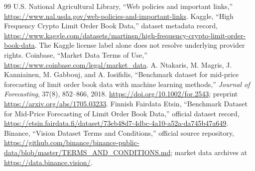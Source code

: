 \documentclass[10pt]{article}
\begin{document}
\begin{thebibliography}{99}
 U.S. National Agricultural Library, ``Web policies and important links,'' \url{https://www.nal.usda.gov/web-policies-and-important-links}.
 Kaggle, ``High Frequency Crypto Limit Order Book Data,'' dataset metadata record, \url{https://www.kaggle.com/datasets/martinsn/high-frequency-crypto-limit-order-book-data}. The Kaggle license label alone does not resolve underlying provider rights.
 Coinbase, ``Market Data Terms of Use,'' \url{https://www.coinbase.com/legal/market_data}.
 A. Ntakaris, M. Magris, J. Kanniainen, M. Gabbouj, and A. Iosifidis, ``Benchmark dataset for mid-price forecasting of limit order book data with machine learning methods,'' \emph{Journal of Forecasting}, 37(8), 852--866, 2018. \url{https://doi.org/10.1002/for.2543}; preprint \url{https://arxiv.org/abs/1705.03233}.
 Finnish Fairdata Etsin, ``Benchmark Dataset for Mid-Price Forecasting of Limit Order Book Data,'' official dataset record, \url{https://etsin.fairdata.fi/dataset/73eb48d7-4dbc-4a10-a52a-da745b47a649}.
 Binance, ``Vision Dataset Terms and Conditions,'' official source repository, \url{https://github.com/binance/binance-public-data/blob/master/TERMS_AND_CONDITIONS.md}; market data archives at \url{https://data.binance.vision/}.
\end{thebibliography}
\end{document}
